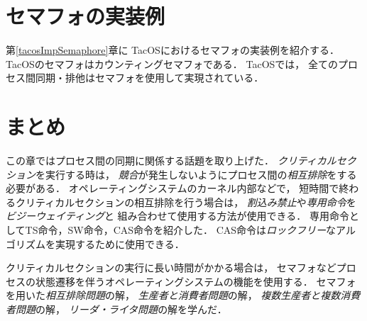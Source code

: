 \section{セマフォの実装例}
第\ref{tacosImpSemaphore}章に
TacOSにおけるセマフォの実装例を紹介する．
TacOSのセマフォはカウンティングセマフォである．
TacOSでは，
全てのプロセス間同期・排他はセマフォを使用して実現されている．

\section{まとめ}
この章ではプロセス間の同期に関係する話題を取り上げた．
\emph{クリティカルセクション}を実行する時は，
\emph{競合}が発生しないようにプロセス間の\emph{相互排除}をする必要がある．
オペレーティングシステムのカーネル内部などで，
短時間で終わるクリティカルセクションの相互排除を行う場合は，
\emph{割込み禁止}や\emph{専用命令}を\emph{ビジーウェイティング}と
組み合わせて使用する方法が使用できる．
専用命令としてTS命令，SW命令，CAS命令を紹介した．
CAS命令は\emph{ロックフリー}なアルゴリズムを実現するために使用できる．

クリティカルセクションの実行に長い時間がかかる場合は，
セマフォなどプロセスの状態遷移を伴うオペレーティングシステムの機能を使用する．
セマフォを用いた\emph{相互排除問題}の解，
\emph{生産者と消費者問題}の解，
\emph{複数生産者と複数消費者問題}の解，
\emph{リーダ・ライタ問題}の解を学んだ．

